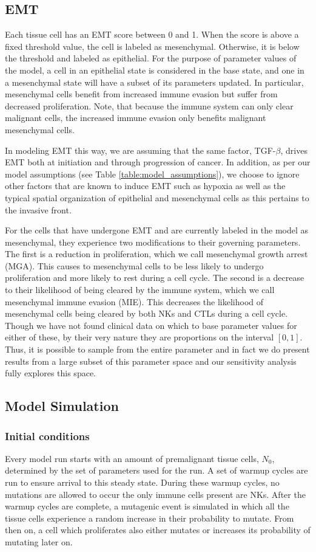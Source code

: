 \documentclass[11pt]{article}
\begin{document}
\subsection{EMT}\label{EMT}
Each tissue cell has an EMT score between 0 and 1.
When the score is above a fixed threshold value, the cell is labeled as mesenchymal.
Otherwise, it is below the threshold and labeled as epithelial.
For the purpose of parameter values of the model, a cell in an epithelial state is considered in the base state, and one in a mesenchymal state will have a subset of its parameters updated.
In particular, mesenchymal cells benefit from increased immune evasion but suffer from decreased proliferation.
Note, that because the immune system can only clear malignant cells, the increased immune evasion only benefits malignant mesenchymal cells.
\par
In modeling EMT this way, we are assuming that the same factor, TGF-$\beta$, drives EMT both at initiation and through progression of cancer.
In addition, as per our model assumptions (see Table \ref{table:model_assumptions}), we choose to ignore other factors that are known to induce EMT such as hypoxia as well as the typical spatial organization of epithelial and mesenchymal cells as this pertains to the invasive front.
\par
For the cells that have undergone EMT and are currently labeled in the model as mesenchymal, they experience two modifications to their governing parameters.
The first is a reduction in proliferation, which we call mesenchymal growth arrest (MGA).
This causes to mesenchymal cells to be less likely to undergo proliferation and more likely to rest during a cell cycle.
The second is a decrease to their likelihood of being cleared by the immune system, which we call mesenchymal immune evasion (MIE). 
This decreases the likelihood of mesenchymal cells being cleared by both NKs and CTLs during a cell cycle.
Though we have not found clinical data on which to base parameter values for either of these, by their very nature they are proportions on the interval $[0,1]$.
Thus, it is possible to sample from the entire parameter and in fact we do present results from a large subset of this parameter space and our sensitivity analysis fully explores this space.

\subsection{Model Simulation}

\subsubsection{Initial conditions} 
Every model run starts with an amount of premalignant tissue cells, $N_0$, determined by the set of parameters used for the run.
A set of warmup cycles are run to ensure arrival to this steady state.
During these warmup cycles, no mutations are allowed to occur the only immune cells present are NKs.
After the warmup cycles are complete, a mutagenic event is simulated in which all the tissue cells experience a random increase in their probability to mutate.
From then on, a cell which proliferates also either mutates or increases its probability of mutating later on.
\end{document}
